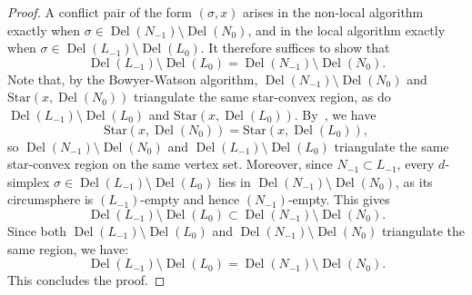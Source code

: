 \documentclass[11pt]{amsart}
\DeclareMathOperator{\DelT}{Del}
\newcommand{\St}{\mathrm{Star}}
\theoremstyle{plain}
\theoremstyle{definition}
\theoremstyle{remark}
\begin{document}
\begin{proof}
A conflict pair of the form $(\sigma,x)$ arises in the non-local algorithm exactly when $\sigma\in \DelT(N_{-1}) \setminus \DelT(N_0)$, and in the local algorithm exactly when 
 $\sigma \in \DelT(L_{-1}) \setminus \DelT(L_0)$.  
        It therefore suffices to show that
        \[\DelT(L_{-1}) \setminus \DelT(L_0) = \DelT(N_{-1}) \setminus \DelT(N_0).\] 
        Note that, by the Bowyer-Watson algorithm, $\DelT(N_{-1}) \setminus \DelT(N_0)$ and $\St(x, \DelT(N_0))$
        triangulate the same star-convex region, as do $\DelT(L_{-1}) \setminus \DelT(L_0)$
        and $\St(x, \DelT(L_0))$. 
        By~, we have
        \[\St(x, \DelT(N_0)) = \St(x, \DelT(L_0)),\]
        so $\DelT(N_{-1}) \setminus \DelT(N_0)$ and $\DelT(L_{-1}) \setminus \DelT(L_0)$
        triangulate the same star-convex region on the same vertex set.
        Moreover, since $N_{-1} \subset L_{-1}$, every $d$-simplex $\sigma \in \DelT(L_{-1}) \setminus \DelT(L_0)$
        lies in $\DelT(N_{-1}) \setminus \DelT(N_0)$, as its circumsphere is $(L_{-1})$-empty
        and hence $(N_{-1})$-empty. 
        This gives
        \[\DelT(L_{-1}) \setminus \DelT(L_0) \subset \DelT(N_{-1}) \setminus \DelT(N_0).\]
        Since both $\DelT(L_{-1}) \setminus \DelT(L_0)$ and $\DelT(N_{-1}) \setminus \DelT(N_0)$
        triangulate the same region, we have:
        \[\DelT(L_{-1}) \setminus \DelT(L_0) = \DelT(N_{-1}) \setminus \DelT(N_0).\]        
    This concludes the proof.
\end{proof}
%
%
%
%
\end{document}
